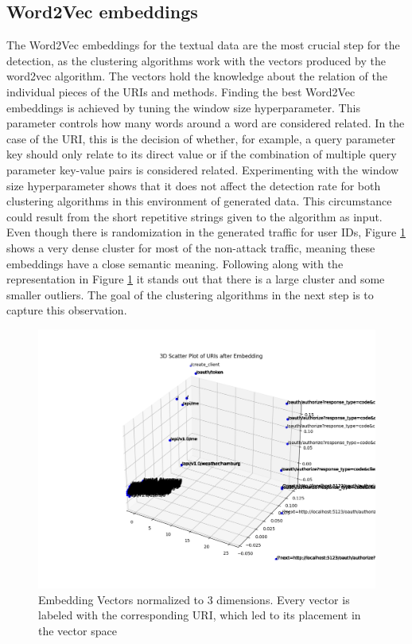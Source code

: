 \documentclass[
    fontsize=12pt,
    headings=small,
    parskip=half,           %
    bibliography=totoc,
    numbers=noenddot,       %
    open=any,               %
    ]{scrreprt}
\begin{document}
\subsection{Word2Vec embeddings}
The Word2Vec embeddings for the textual data are the most crucial step for the detection, as the clustering algorithms work with the vectors produced by the word2vec algorithm. The vectors hold the knowledge about the relation of the individual pieces of the URIs and methods. Finding the best Word2Vec embeddings is achieved by tuning the window size hyperparameter. This parameter controls how many words around a word are considered related. In the case of the URI, this is the decision of whether, for example, a query parameter key should only relate to its direct value or if the combination of multiple query parameter key-value pairs is considered related. Experimenting with the window size hyperparameter shows that it does not affect the detection rate for both clustering algorithms in this environment of generated data. This circumstance could result from the short repetitive strings given to the algorithm as input. Even though there is randomization in the generated traffic for user IDs, Figure \ref{fig:word_embeddings3D} shows a very dense cluster for most of the non-attack traffic, meaning these embeddings have a close semantic meaning. Following along with the representation in Figure \ref{fig:word_embeddings3D} it stands out that there is a large cluster and some smaller outliers. The goal of the clustering algorithms in the next step is to capture this observation.

\begin{figure}[H]
	\sffamily\footnotesize
	\includegraphics[width=1\textwidth]{pic/word_embeddings_3d.png}
	\unitlength=0.75mm
	\linethickness{0.4pt}
	\caption{Embedding Vectors normalized to 3 dimensions. Every vector is labeled with the corresponding URI, which led to its placement in the vector space}
	\label{fig:word_embeddings3D}
\end{figure}
\end{document}
